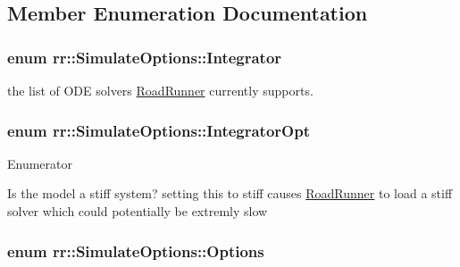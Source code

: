 \subsection{Member Enumeration Documentation}
\hypertarget{structrr_1_1_simulate_options_a9161fd2b138ff28e97491611dce61a52}{
\subsubsection[{Integrator}]{\setlength{\rightskip}{0pt plus 5cm}enum {\bf rr\-::\-Simulate\-Options\-::\-Integrator}}}\label{structrr_1_1_simulate_options_a9161fd2b138ff28e97491611dce61a52}
the list of O\-D\-E solvers \hyperlink{classrr_1_1_road_runner}{Road\-Runner} currently supports. \hypertarget{structrr_1_1_simulate_options_ab99045a66d2e6715020463d3bd0e30e0}{
\subsubsection[{Integrator\-Opt}]{\setlength{\rightskip}{0pt plus 5cm}enum {\bf rr\-::\-Simulate\-Options\-::\-Integrator\-Opt}}}\label{structrr_1_1_simulate_options_ab99045a66d2e6715020463d3bd0e30e0}
\begin{Desc}
\item[Enumerator]\par
\begin{description}
\item[{\em 
\hypertarget{structrr_1_1_simulate_options_ab99045a66d2e6715020463d3bd0e30e0ae9161281bed7ccbcb6c9589123b371bb}{Stiff}\label{structrr_1_1_simulate_options_ab99045a66d2e6715020463d3bd0e30e0ae9161281bed7ccbcb6c9589123b371bb}
}]Is the model a stiff system? setting this to stiff causes \hyperlink{classrr_1_1_road_runner}{Road\-Runner} to load a stiff solver which could potentially be extremly slow \end{description}
\end{Desc}
\hypertarget{structrr_1_1_simulate_options_a4bc2a6d4d8f9da649e8e2a507192c8fa}{
\subsubsection[{Options}]{\setlength{\rightskip}{0pt plus 5cm}enum {\bf rr\-::\-Simulate\-Options\-::\-Options}}}\label{structrr_1_1_simulate_options_a4bc2a6d4d8f9da649e8e2a507192c8fa}
